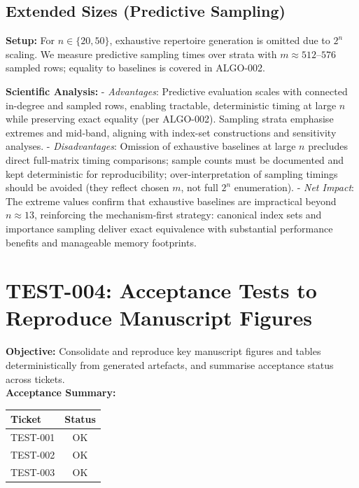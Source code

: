 \documentclass{article}
\begin{document}
\subsection*{Extended Sizes (Predictive Sampling)}
\textbf{Setup:} For $n\in\{20,50\}$, exhaustive repertoire generation is omitted due to $2^n$ scaling. We measure predictive sampling times over strata with $m\approx 512$--$576$ sampled rows; equality to baselines is covered in ALGO-002.\\
\begin{center}
\end{center}
\textbf{Scientific Analysis:}
- \emph{Advantages}: Predictive evaluation scales with connected in-degree and sampled rows, enabling tractable, deterministic timing at large $n$ while preserving exact equality (per ALGO-002). Sampling strata emphasise extremes and mid-band, aligning with index-set constructions and sensitivity analyses.
- \emph{Disadvantages}: Omission of exhaustive baselines at large $n$ precludes direct full-matrix timing comparisons; sample counts must be documented and kept deterministic for reproducibility; over-interpretation of sampling timings should be avoided (they reflect chosen $m$, not full $2^n$ enumeration).
- \emph{Net Impact}: The extreme values confirm that exhaustive baselines are impractical beyond $n\approx 13$, reinforcing the mechanism-first strategy: canonical index sets and importance sampling deliver exact equivalence with substantial performance benefits and manageable memory footprints.


\section{TEST-004: Acceptance Tests to Reproduce Manuscript Figures}
\textbf{Objective:} Consolidate and reproduce key manuscript figures and tables deterministically from generated artefacts, and summarise acceptance status across tickets.\\
\textbf{Acceptance Summary:}\\
\begin{center}
\begin{tabular}{lc}
\toprule
Ticket & Status \\
\midrule
TEST-001 & OK \\
TEST-002 & OK \\
TEST-003 & OK \\
\bottomrule
\end{tabular}
\end{center}
\end{document}
